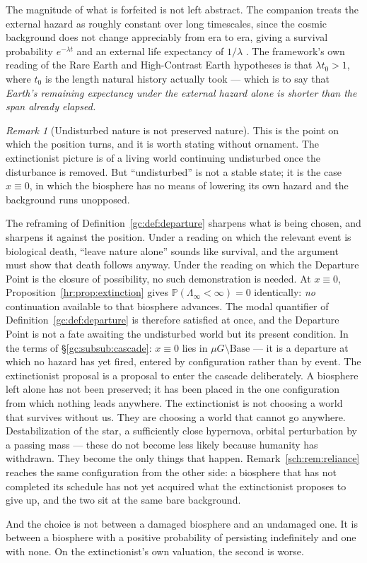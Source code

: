 \documentclass[11pt]{article}
\numberwithin{equation}{section}
\theoremstyle{plain}
\theoremstyle{definition}
\theoremstyle{remark}
\newtheorem{remark}[theorem]{Remark}
\newcommand{\PP}{\mathbb{P}}
\begin{document}
The magnitude of what is forfeited is not left abstract. The companion
treats the external hazard as roughly constant over long timescales,
since the cosmic background does not change appreciably from era to era,
giving a survival probability $e^{-\lambda t}$ and an external life
expectancy of $1/\lambda$ \cite{Nexus}. The framework's own reading of
the Rare Earth and High-Contrast Earth hypotheses is that
$\lambda t_0>1$, where $t_0$ is the length natural history actually
took --- which is to say that \emph{Earth's remaining expectancy under
the external hazard alone is shorter than the span already elapsed.}

\begin{remark}[Undisturbed nature is not preserved nature]
\label{hr:rem:undisturbed}
This is the point on which the position turns, and it is worth stating
without ornament. The extinctionist picture is of a living world
continuing undisturbed once the disturbance is removed. But
``undisturbed'' is not a stable state; it is the case $x\equiv0$, in
which the biosphere has no means of lowering its own hazard and the
background runs unopposed.

The reframing of Definition~\ref{gc:def:departure} sharpens what is
being chosen, and sharpens it against the position. Under a reading on
which the relevant event is biological death, ``leave nature alone''
sounds like survival, and the argument must show that death follows
anyway. Under the reading on which the Departure Point is the closure of
possibility, no such demonstration is needed. At $x\equiv0$,
Proposition~\ref{hr:prop:extinction} gives
$\PP(\Lambda_\infty<\infty)=0$ identically: \emph{no} continuation
available to that biosphere advances. The modal quantifier of
Definition~\ref{gc:def:departure} is therefore satisfied at once, and
the Departure Point is not a fate awaiting the undisturbed world but
its present condition. In the terms of
\S\ref{gc:subsub:cascade}: $x\equiv0$ lies in
$\mu G\setminus\mathrm{Base}$ --- it is a departure at which no hazard
has yet fired, entered by configuration rather than by event. The
extinctionist proposal is a proposal to enter the cascade
deliberately. A biosphere left alone has not been preserved;
it has been placed in the one configuration from which nothing
leads anywhere. The extinctionist is not choosing a world that
survives without us. They are choosing a world that cannot go
anywhere. Destabilization of the star, a sufficiently
close hypernova, orbital perturbation by a passing mass --- these do not
become less likely because humanity has withdrawn. They become the only
things that happen. Remark~\ref{sch:rem:reliance} reaches the same
configuration from the other side: a biosphere that has not completed its
schedule has not yet acquired what the extinctionist proposes to give up,
and the two sit at the same bare background.

And the choice is not between a damaged biosphere and an undamaged one.
It is between a biosphere with a positive probability of persisting
indefinitely and one with none. On the extinctionist's own valuation,
the second is worse.
\end{remark}
\end{document}
